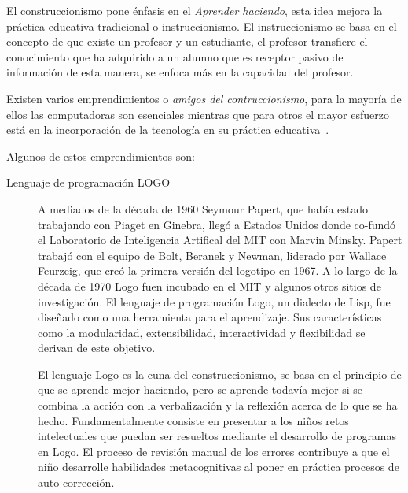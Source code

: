 El construccionismo pone énfasis en el \emph{Aprender haciendo}, esta idea
mejora la práctica educativa tradicional o instruccionismo. El instruccionismo
se basa en el concepto de que existe un profesor y un estudiante, el profesor
transfiere el conocimiento que ha adquirido a un alumno que es receptor pasivo
de información de esta manera, se enfoca más en la capacidad del profesor. 

Existen varios emprendimientos o \emph{amigos del contruccionismo}, para la
mayoría de ellos las computadoras son esenciales mientras que para otros el
mayor esfuerzo está en la incorporación de la tecnología en su práctica
educativa~\cite{papertian:const}.

Algunos de estos emprendimientos son:

\begin{description}

\item[Lenguaje de programación LOGO]  A mediados de la década de 1960 Seymour
	Papert, que había estado trabajando con Piaget en Ginebra, llegó a
	Estados Unidos donde co-fundó el Laboratorio de Inteligencia Artifical
	del MIT con Marvin Minsky. Papert trabajó con el equipo de Bolt, Beranek
	y Newman, liderado por Wallace Feurzeig, que creó la primera versión del
	logotipo en 1967. A lo largo de la década de 1970 Logo fuen incubado en
	el MIT y algunos otros sitios de investigación. El lenguaje de
	programación Logo, un dialecto de Lisp, fue diseñado como una
	herramienta para el aprendizaje. Sus características como la
	modularidad, extensibilidad, interactividad y flexibilidad se derivan de
	este objetivo. 

	El lenguaje Logo es la cuna del construccionismo, se basa en el
	principio de que se aprende mejor haciendo, pero se aprende todavía
	mejor si se combina la acción con la verbalización  y la reflexión
	acerca de lo que se ha hecho. Fundamentalmente consiste en presentar a
	los niños retos intelectuales que puedan ser resueltos mediante el
	desarrollo de programas en Logo. El proceso de revisión manual de los
	errores contribuye a que el niño desarrolle habilidades metacognitivas
	al poner en práctica procesos de auto-corrección\cite{logo:sg}.




\end{description}
